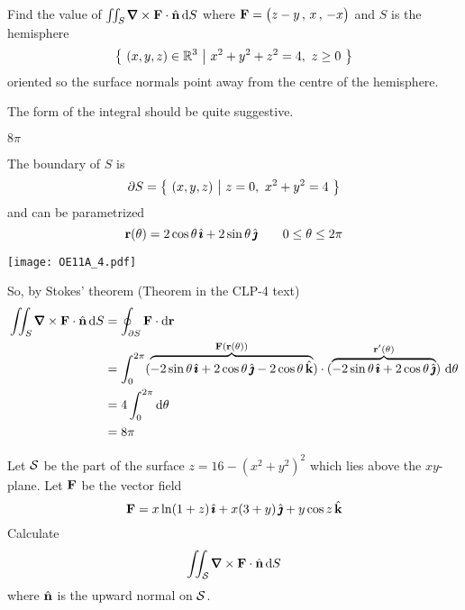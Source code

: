 \begin{question}[M317 2011A] %
Find the value of
$\dblInt_S\vnabla\times\vF\cdot\hn\,\dee{S}$ where 
$\mathbf{F} = \big(z - y\,,\, x\,,\, -x\big)$ and $S$ is the hemisphere 
\begin{equation*}
\big\{ \ (x, y, z) \in\mathbb{R}^3 \ \big|\  x^2 + y^2 + z^2 = 4,\ z \ge 0\ \big\} 
\end{equation*}
oriented so the surface normals point away from the centre of the
hemisphere.
\end{question}

\begin{hint} 
The form of the integral should be quite suggestive.
\end{hint}

\begin{answer} 
$8\pi$
\end{answer}

\begin{solution} 
The boundary of $S$ is
\begin{equation*}
\partial S = \Set{(x,y,z)}{z=0,\ x^2+y^2=4}
\end{equation*}
and can be parametrized
\begin{equation*}
\mathbf{r}(\theta) = 2\cos\theta\,\hat{\pmb{\imath}} +2\sin\theta\,\hat{\pmb{\jmath}}\qquad
0\le\theta\le 2\pi
\end{equation*}
\begin{center}
     \texttt{[image: OE11A\_4.pdf]}
\end{center}
So, by Stokes' theorem (Theorem  in the CLP-4 text)
\begin{align*}
\dblInt_S\vnabla\times\vF\cdot\hn\,\dee{S}
&=\oint_{\partial S}\vF\cdot\dee{\vr} \\
&=\int_0^{2\pi} (\overbrace{-2\sin\theta\,\hi+2\cos\theta\,\hj-2\cos\theta\,\hk}^
               {\vF(\vr(\theta))})\cdot
     (\overbrace{-2\sin\theta\,\hi+2\cos\theta\,\hj}^
                {\vr'(\theta)})\ \dee{\theta} \\
&=4\int_0^{2\pi}\dee{\theta} \\
&=8\pi
\end{align*} 
\end{solution}

\begin{question}[M317 1998D] %
 Let $\mathcal{S}$ be the part of the surface $z=16-{(x^2+y^2)}^2$
which lies above the $xy$-plane. Let $\mathbf{F}$ be the vector field
$$
\mathbf{F}=x\ln(1+z)\,\hat{\pmb{\imath}}+x(3+y)\,\hat{\pmb{\jmath}}+y\cos z\,\hat{\mathbf{k}}
$$
Calculate
$$
\dblInt_{\cS}\vnabla\times\vF\cdot\hn\,\dee{S}
$$
where $\hat{\mathbf{n}}$ is the upward normal on $\mathcal{S}$.
\end{question}


